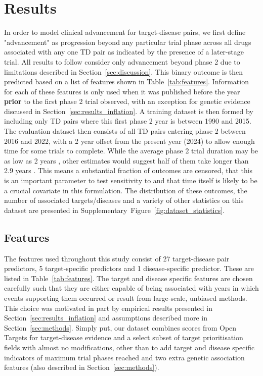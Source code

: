 \documentclass{article}
\begin{document}
\section{Results}
\label{sec:results}

In order to model clinical advancement for target-disease pairs, we first define "advancement" as progression beyond any particular trial phase across all drugs associated with any one TD pair as indicated by the presence of a later-stage trial. All results to follow consider only advancement beyond phase 2 due to limitations described in Section~\ref{sec:discussion}. This binary outcome is then predicted based on a list of features shown in Table~\ref{tab:features}. Information for each of these features is only used when it was published before the year \textbf{prior} to the first phase 2 trial observed, with an exception for genetic evidence discussed in Section~\ref{sec:results_inflation}. A training dataset is then formed by including only TD pairs where this first phase 2 year is between 1990 and 2015. The evaluation dataset then consists of all TD pairs entering phase 2 between 2016 and 2022, with a 2 year offset from the present year (2024) to allow enough time for some trials to complete. While the average phase 2 trial duration may be as low as 2 years \cite{fdaStepClinical}, other estimates would suggest half of them take longer than 2.9 years \cite{PMID:29394327}. This means a substantial fraction of outcomes are censored, that this is an important parameter to test sensitivity to and that time itself is likely to be a crucial covariate in this formulation. The distribution of these outcomes, the number of associated targets/diseases and a variety of other statistics on this dataset are presented in Supplementary~Figure~\ref{fig:dataset_statistics}.

\subsection{Features}
\label{sec:features}

The features used throughout this study consist of 27 target-disease pair predictors, 5 target-specific predictors and 1 disease-specific predictor. These are listed in Table~\ref{tab:features}. The target and disease specific features are chosen carefully such that they are either capable of being associated with years in which events supporting them occurred or result from large-scale, unbiased methods. This choice was motivated in part by empirical results presented in Section~\ref{sec:results_inflation} and assumptions described more in Section~\ref{sec:methods}. Simply put, our dataset combines scores from Open Targets for target-disease evidence and a select subset of target prioritisation \cite{OTtargetPrioritisation} fields with almost no modifications, other than to add target and disease specific indicators of maximum trial phases reached and two extra genetic association features (also described in Section~\ref{sec:methods}).
\end{document}
